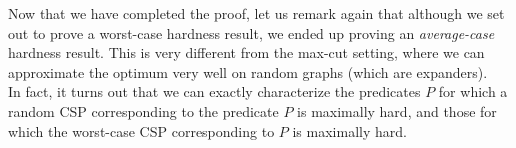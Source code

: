 	Now that we have completed the proof, let us remark again that although we set out to prove a worst-case hardness result, we ended up proving an \emph{average-case} hardness result. This is very different from the max-cut setting, where we can approximate the optimum very well on random graphs (which are expanders).\\

	In fact, it turns out that we can exactly characterize the predicates $P$ for which a random CSP corresponding to the predicate $P$ is maximally hard, and those for which the worst-case CSP corresponding to $P$ is maximally hard.
